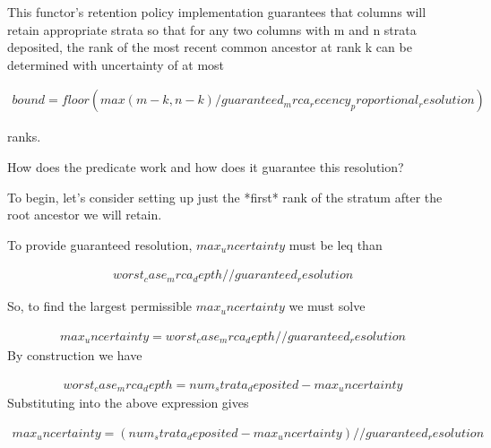 This functor's retention policy implementation guarantees that columns
will retain appropriate strata so that for any two columns with m and n
strata deposited, the rank of the most recent common ancestor at rank k
can be determined with uncertainty of at most

\begin{align*}
    bound = floor(
        max(m - k, n - k)
        / guaranteed_mrca_recency_proportional_resolution
    )
\end{align*}

ranks.

How does the predicate work and how does it guarantee this resolution?

To begin, let's consider setting up just the *first* rank of the
stratum after the root ancestor we will retain.



To provide guaranteed resolution, $max_uncertainty$ must be leq than

\begin{align*}
   worst_case_mrca_depth // guaranteed_resolution
\end{align*}

So, to find the largest permissible $max_uncertainty$ we must solve

\begin{align*}
   max_uncertainty = worst_case_mrca_depth // guaranteed_resolution
\end{align*}
By construction we have

\begin{align*}
   worst_case_mrca_depth = num_strata_deposited - max_uncertainty
\end{align*}
Substituting into the above expression gives

\begin{align*}
   max_uncertainty
   = (num_strata_deposited - max_uncertainty) // guaranteed_resolution
\end{align*}

